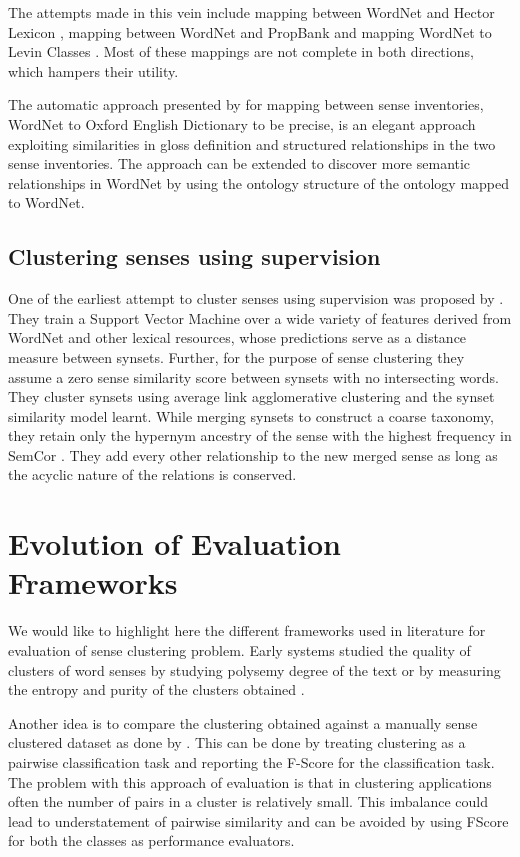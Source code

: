 The attempts made in this vein include mapping between WordNet and Hector Lexicon \citep{palmer2007making}, mapping between WordNet and PropBank \citep{palmer2004different} and mapping WordNet to Levin Classes \citep{levin1993english} \citep{palmer2007making}. Most of these mappings are not complete in both directions, which hampers their utility.

The automatic approach presented by \citep{Navigli06meaningfulclustering} for mapping between sense inventories, WordNet to Oxford English Dictionary to be precise, is an elegant approach exploiting similarities in gloss definition and structured relationships in the two sense inventories. The approach can be extended to discover more semantic relationships in WordNet by using the ontology structure of the ontology mapped to WordNet.

\subsection{Clustering senses using supervision}
One of the earliest attempt to cluster senses using supervision was proposed by \citep{snow07mergesense}. They train a Support Vector Machine \citep{vapnikSVM:95} over a wide variety of features derived from WordNet and other lexical resources, whose predictions serve as a distance measure between synsets. Further, for the purpose of sense clustering they assume a zero sense similarity score between synsets with no intersecting words. They cluster synsets using average link agglomerative clustering and the synset similarity model learnt. While merging synsets to construct a coarse taxonomy, they retain only the hypernym ancestry of the sense with the highest frequency in SemCor \citep{SemCor}. They add every other relationship to the new merged sense as long as the acyclic nature of the relations is conserved.

\section{Evolution of Evaluation Frameworks}
We would like to highlight here the different frameworks used in literature for evaluation of sense clustering problem. Early systems studied the quality of clusters of word senses by studying polysemy degree of the text \citep{Mihalcea01ez.wordnet:principles} or by measuring the entropy and purity of the clusters obtained \citep{agirre2003clustering}.

Another idea is to compare the clustering obtained against a manually sense clustered dataset as done by \citep{chklovski2003exploiting}. This can be done by treating clustering as a pairwise classification task and reporting the F-Score for the classification task. The problem with this approach of evaluation is that in clustering applications often the number of pairs in a cluster is relatively small. This imbalance could lead to understatement of pairwise similarity and can be avoided by using FScore for both the classes as performance evaluators.

